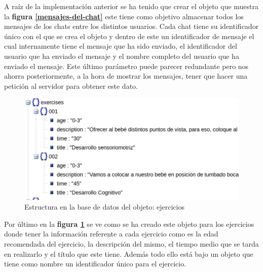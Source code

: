 A raíz de la implementación anterior se ha tenido que crear el objeto
que muestra la \textbf{figura \ref{mensajes-del-chat}} este tiene como
objetivo almacenar todos los mensajes de los chats entre los distintos
usuarios. Cada chat tiene su identificador único con el que se crea el
objeto y dentro de este un identificador de mensaje el cual internamente
tiene el mensaje que ha sido enviado, el identificador del usuario que
ha enviado el mensaje y el nombre completo del usuario que ha enviado
el mensaje. Este último parámetro puede parecer redundante pero nos
ahorra posteriormente, a la hora de mostrar los mensajes, tener que hacer
una petición al servidor para obtener este dato.

\medskip
\begin{figure}
    \includegraphics[width=\linewidth]{./images/database/exercises-database.png}
    \caption{Estructura en la base de datos del objeto: ejercicios}
    \label{ejercicios}
\end{figure}

Por último en la \textbf{figura \ref{ejercicios}} se ve
como se ha creado este objeto para los ejercicios donde tener la información
referente a cada ejercicio como es la edad recomendada del ejercicio,
la descripción del mismo, el tiempo medio que se tarda en realizarlo y el
título que este tiene. Además todo ello está bajo un objeto que tiene como
nombre un identificador único para el ejercicio.

